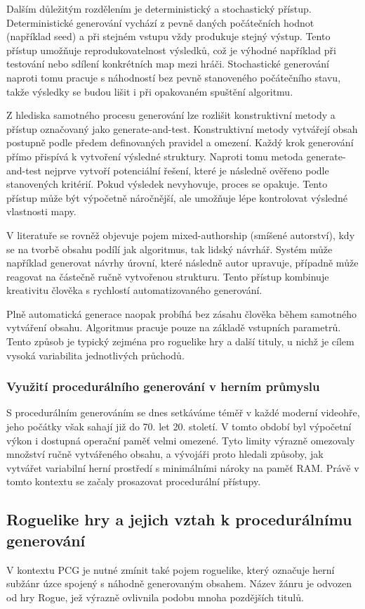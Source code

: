 \documentclass[
  program=itk,
  biblatex,
  figures=false,
  glossaries,
  index
]{kidiplom}
\begin{document}
Dalším důležitým rozdělením je deterministický a stochastický přístup. Deterministické generování vychází z pevně daných počátečních hodnot (například seed) a při stejném vstupu vždy produkuje stejný výstup. Tento přístup umožňuje reprodukovatelnost výsledků, což je výhodné například při testování nebo sdílení konkrétních map mezi hráči. Stochastické generování naproti tomu pracuje s náhodností bez pevně stanoveného počátečního stavu, takže výsledky se budou lišit i při opakovaném spuštění algoritmu.

Z hlediska samotného procesu generování lze rozlišit konstruktivní metody a přístup označovaný jako generate-and-test. Konstruktivní metody vytvářejí obsah postupně podle předem definovaných pravidel a omezení. Každý krok generování přímo přispívá k vytvoření výsledné struktury. Naproti tomu metoda generate-and-test nejprve vytvoří potenciální řešení, které je následně ověřeno podle stanovených kritérií. Pokud výsledek nevyhovuje, proces se opakuje. Tento přístup může být výpočetně náročnější, ale umožňuje lépe kontrolovat výsledné vlastnosti mapy.

V literatuře se rovněž objevuje pojem mixed-authorship (smíšené autorství), kdy se na tvorbě obsahu podílí jak algoritmus, tak lidský návrhář. Systém může například generovat návrhy úrovní, které následně autor upravuje, případně může reagovat na částečně ručně vytvořenou strukturu. Tento přístup kombinuje kreativitu člověka s rychlostí automatizovaného generování.

Plně automatická generace naopak probíhá bez zásahu člověka během samotného vytváření obsahu. Algoritmus pracuje pouze na základě vstupních parametrů. Tento způsob je typický zejména pro roguelike hry a další tituly, u nichž je cílem vysoká variabilita jednotlivých průchodů.

\subsubsection{Využití procedurálního generování v herním průmyslu}
S procedurálním generováním se dnes setkáváme téměř v každé moderní videohře, jeho počátky však sahají již do 70. let 20. století. V tomto období byl výpočetní výkon i dostupná operační paměť velmi omezené. Tyto limity výrazně omezovaly množství ručně vytvářeného obsahu, a vývojáři proto hledali způsoby, jak vytvářet variabilní herní prostředí s minimálními nároky na paměť RAM. Právě v tomto kontextu se začaly prosazovat procedurální přístupy.

\subsection{Roguelike hry a jejich vztah k procedurálnímu generování}
V kontextu PCG je nutné zmínit také pojem roguelike, který označuje herní subžánr úzce spojený s náhodně generovaným obsahem. Název žánru je odvozen od hry Rogue, jež výrazně ovlivnila podobu mnoha pozdějších titulů.
\end{document}
